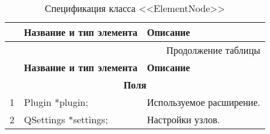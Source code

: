 \small
\singlespacing
\begin{longtable}[h]{|p{}|p{}|p{}|}
  \caption{Спецификация класса <<ElementNode>>}
	\\ \hline
	  \textbf{\No}                  &
	  \textbf{Название и тип элемента}  &
	  \textbf{Описание}
	\\ \hline
  \endfirsthead

  \multicolumn{3}{r}{Продолжение таблицы \thetable{}}
  \\ \hline
	  \textbf{\No}                  &
	  \textbf{Название и тип элемента}  &
	  \textbf{Описание}
	\\ \hline
  \endhead

  \multicolumn{3}{|c|}{\textbf{Поля}} \\
  \hline
  1 & Plugin    *plugin; & Используемое расширение.\\ \hline
  2 & QSettings *settings; & Настройки узлов.\\ \hline


\end{longtable}
